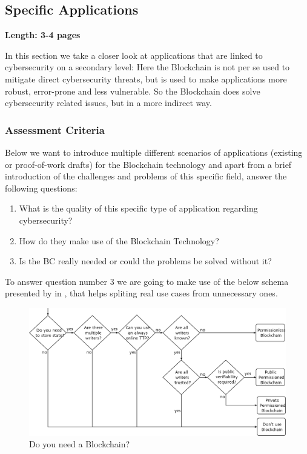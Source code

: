 \subsection{Specific Applications}
\label{subsec:03_applications}

\textbf{Length: 3-4 pages}

In this section we take a closer look at applications that are linked to cybersecurity on a secondary level: Here the Blockchain is not per se used to mitigate direct cybersecurity threats, but is used to make applications more robust, error-prone and less vulnerable. So the Blockchain does solve cybersecurity related issues, but in a more indirect way.

\subsubsection{Assessment Criteria}
Below we want to introduce multiple different scenarios of applications (existing or proof-of-work drafts) for the Blockchain technology and apart from a brief introduction of the challenges and problems of this specific field, answer the following questions:
\begin{enumerate}
	\item What is the quality of this specific type of application regarding cybersecurity? 
	\item How do they make use of the Blockchain Technology?
	\item Is the BC really needed or could the problems be solved without it? 
\end{enumerate}
To answer question number 3 we are going to make use of the below schema presented by \citeauthor{Wust2017} in \cite{Wust2017}, that helps spliting real use cases from unnecessary ones.
\begin{figure}[ht!]
  \begin{center}
  \includegraphics[scale=0.6]{Talk7/img/app/BCorNot}
  \end{center}
  \caption{Do you need a Blockchain?}
  \label{blockchain_or_not}
\end{figure}

